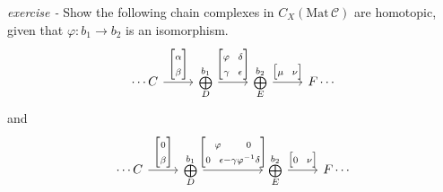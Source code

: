\documentclass[11pt]{article}
\theoremstyle{definition}
\begin{document}

    \emph{exercise - } Show the following chain complexes in \(C_X(\text{Mat}\,\mathcal{C})\) are homotopic, given that \(\varphi: b_1 \to b_2\) is an isomorphism.
    \begin{equation*}
        \begin{tikzcd}
            \cdots C \arrow[r,"{\begin{bmatrix} \alpha\\ \beta \end{bmatrix}}"] &\substack{b_1\\ \bigoplus \\ D} \arrow[r,"{\begin{bmatrix} \varphi \;\;\; \delta \\ \gamma \;\;\; \epsilon \end{bmatrix}}"] &\substack{b_2\\ \bigoplus \\ E} \arrow[r,"{\begin{bmatrix} \mu\;\;\;\nu \end{bmatrix}}"] &F \cdots
        \end{tikzcd}
    \end{equation*}
    and
    \begin{equation*}
        \begin{tikzcd}
            \cdots C \arrow[r,"{\begin{bmatrix} 0\\ \beta \end{bmatrix}}"] &\substack{b_1\\ \bigoplus \\ D} \arrow[rr,"{\begin{bmatrix} \varphi \quad\quad 0 \\ 0 \;\;\; \epsilon-\gamma \varphi^{-1} \delta \end{bmatrix}}"] &&\substack{b_2\\ \bigoplus \\ E} \arrow[r,"{\begin{bmatrix} 0\;\;\;\nu \end{bmatrix}}"] &F \cdots
        \end{tikzcd}
    \end{equation*}
\end{document}
